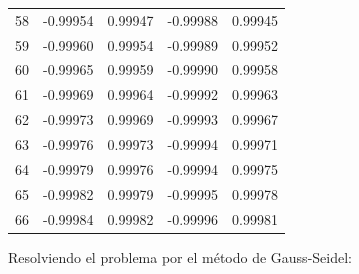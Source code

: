 \begin{itemize}
\begin{center}
\begin{tabular}{r|llll}
        58 & -0.99954 & 0.99947 & -0.99988 & 0.99945 \\
        59 & -0.99960 & 0.99954 & -0.99989 & 0.99952 \\
        60 & -0.99965 & 0.99959 & -0.99990 & 0.99958 \\
        61 & -0.99969 & 0.99964 & -0.99992 & 0.99963 \\
        62 & -0.99973 & 0.99969 & -0.99993 & 0.99967 \\
        63 & -0.99976 & 0.99973 & -0.99994 & 0.99971 \\
        64 & -0.99979 & 0.99976 & -0.99994 & 0.99975 \\
        65 & -0.99982 & 0.99979 & -0.99995 & 0.99978 \\
        66 & -0.99984 & 0.99982 & -0.99996 & 0.99981 \\
    \end{tabular}
    \end{center}

Resolviendo el problema por el método de Gauss-Seidel:


\end{itemize}
